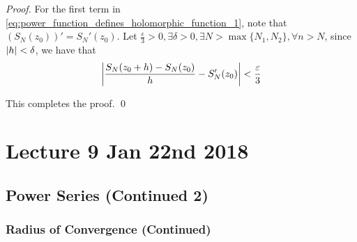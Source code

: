 \documentclass[11pt, oneside]{book}
\begin{document}
\begin{proof}
	For the first term in \cref{eq:power_function_defines_holomorphic_function_1}, note that $(S_N(z_0))' = S_N'(z_0)$. Let $\frac{\epsilon}{3} > 0, \exists \delta > 0, \exists N > \max\{N_1, N_2\}, \forall n > N$, since $\left|h\right| < \delta$, we have that
	\begin{equation*}
		\left|\frac{S_N(z_0 + h) - S_N(z_0)}{h} - S_N'(z_0)\right| < \frac{\varepsilon}{3}
	\end{equation*}

	This completes the proof. \qed
\end{proof}




\chapter{Lecture 9 Jan 22nd 2018}
	\label{chapter:lecture_9_jan_22nd_2018}

\section{Power Series (Continued 2)} %
\label{sec:power_series_continued_2}

\subsection{Radius of Convergence (Continued)} %
\label{sub:radius_of_convergence_continued}
\end{document}
